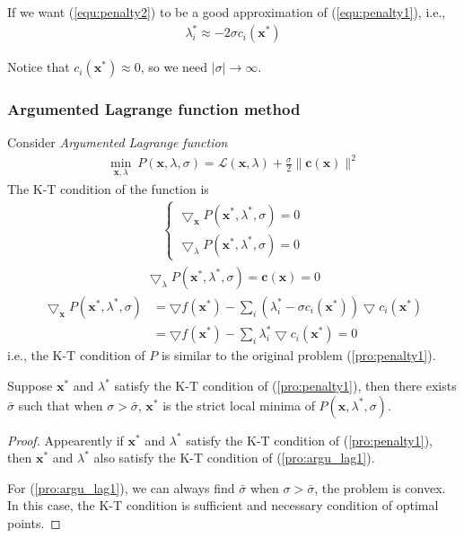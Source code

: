 If we want (\ref{equ:penalty2}) to be a good
approximation of (\ref{equ:penalty1}), i.e.,
\begin{align}
    \lambda_i^* \approx - 2 \sigma c_i(\mathbf{x}^*)
\end{align}

Notice that $c_i(\mathbf{x}^*) \approx 0$, so we need
$|\sigma| \rightarrow \infty $.

\subsubsection{Argumented Lagrange function method}
Consider \emph{Argumented Lagrange function}
\begin{align}
    \min_{\mathbf{x}, \lambda}
     \ P(\mathbf{x}, \lambda, \sigma) = 
    \mathcal{L}(\mathbf{x}, \lambda) + 
    \frac{\sigma}{2} \parallel \mathbf{c}
    (\mathbf{x}) \parallel^2
    \label{pro:argu_lag1}
\end{align}
The K-T condition of the function is
\begin{align}
    \left\{
        \begin{array}{ll}
            \bigtriangledown_{\mathbf{x}} P
            (\mathbf{x}^*, \lambda^*, \sigma) = 0 \\
            \bigtriangledown_{\lambda} P
            (\mathbf{x}^*, \lambda^*, \sigma) = 0
        \end{array}
        \right.
\end{align}
\begin{align}
    \bigtriangledown_{\lambda} P
    (\mathbf{x}^*, \lambda^*, \sigma) = 
    \mathbf{c}(\mathbf{x}) = 0
\end{align}
\begin{align}
    \bigtriangledown_{\mathbf{x}} P(\mathbf{x}^*, \lambda^*, \sigma) &= 
    \bigtriangledown f(\mathbf{x}^*) - 
    \sum_i (\lambda_i^* - \sigma c_i(\mathbf{x}^*)) \bigtriangledown
    c_i(\mathbf{x}^*) \\ &=
    \bigtriangledown f(\mathbf{x}^*) - 
    \sum_i \lambda_i^* \bigtriangledown
    c_i(\mathbf{x}^*) = 0
\end{align}
i.e., the K-T condition of $P$ is similar to the original
problem (\ref{pro:penalty1}).
\begin{theorem}
    Suppose $\mathbf{x}^*$ and $\lambda^*$ satisfy
    the K-T condition of (\ref{pro:penalty1}),
    then there exists $\bar{\sigma}$ such that
    when $\sigma > \bar{\sigma}$,
    $\mathbf{x}^*$ is the strict local minima
    of $P(\mathbf{x}, \lambda^*, \sigma)$.
\end{theorem}
\begin{proof}
    Appearently if $\mathbf{x}^*$ and $\lambda^*$ satisfy
    the K-T condition of (\ref{pro:penalty1}),
    then $\mathbf{x}^*$ and $\lambda^*$ also satisfy
    the K-T condition of (\ref{pro:argu_lag1}).
    \par
    For (\ref{pro:argu_lag1}), we can always find
    $\bar{\sigma}$ when $\sigma > \bar{\sigma}$,
    the problem is convex. In this case, the
    K-T condition is sufficient and necessary
    condition of optimal points.
\end{proof}

